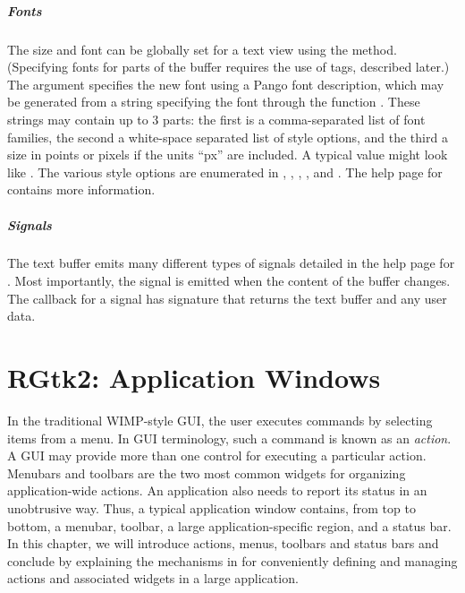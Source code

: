 \paragraph{Fonts}
The size and font can be globally set for a text view using the
 method. (Specifying fonts for parts of
the buffer requires the use of tags, described later.) The argument
 specifies the new font using
a Pango font description, which may be generated from a
string specifying the font through the function
. These strings may contain up to
3 parts: the first is a comma-separated list of font families, the
second a white-space separated list of style options, and the third a
size in points or pixels if the units ``px'' are included. A typical
value might look like . The various style options are enumerated in ,
, , , and
. The help page for 
contains more information.

\paragraph{Signals}
The text buffer emits many different types of signals detailed in the
help page for . Most importantly, the
 signal is emitted when the content of the buffer
changes. The callback for a  signal has signature that
returns the text buffer and any user data.







\chapter{RGtk2: Application Windows}
\label{sec:RGtk2-menus}


In the traditional WIMP-style GUI, the user executes commands by
selecting items from a menu. In GUI terminology, such a command is
known as an \textit{action}. A GUI may provide more than one control
for executing a particular action. Menubars and toolbars are the two
most common widgets for organizing application-wide actions. An
application also needs to report its status in an unobtrusive
way. Thus, a typical application window contains, from top to bottom, 
a menubar, toolbar, a large application-specific region, and a
status bar.  In this chapter, we will introduce actions, menus,
toolbars and status bars and conclude by explaining the mechanisms in
\GTK\/ for conveniently defining and managing actions and associated
widgets in a large application.

